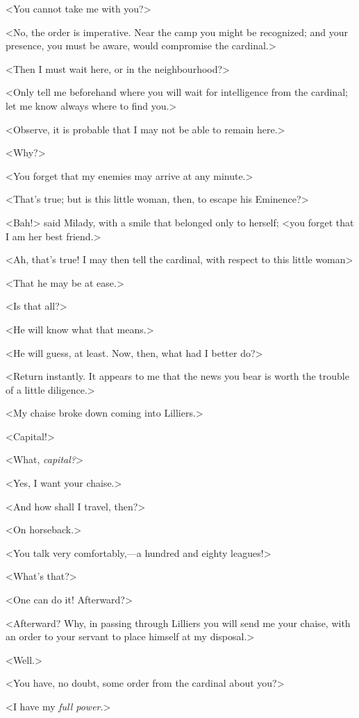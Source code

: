 <You cannot take me with you?> 

<No, the order is imperative. Near the camp you might be recognized; and your presence, you must be aware, would compromise the cardinal.> 

<Then I must wait here, or in the neighbourhood?> 

<Only tell me beforehand where you will wait for intelligence from the cardinal; let me know always where to find you.> 

<Observe, it is probable that I may not be able to remain here.> 

<Why?> 

<You forget that my enemies may arrive at any minute.> 

<That's true; but is this little woman, then, to escape his Eminence?> 

<Bah!> said Milady, with a smile that belonged only to herself; <you forget that I am her best friend.> 

<Ah, that's true! I may then tell the cardinal, with respect to this little woman\longdash> 

<That he may be at ease.> 

<Is that all?> 

<He will know what that means.> 

<He will guess, at least. Now, then, what had I better do?> 

<Return instantly. It appears to me that the news you bear is worth the trouble of a little diligence.> 

<My chaise broke down coming into Lilliers.> 

<Capital!> 

<What, \emph{capital?}> 

<Yes, I want your chaise.> 

<And how shall I travel, then?> 

<On horseback.> 

<You talk very comfortably,—a hundred and eighty leagues!> 

<What's that?> 

<One can do it! Afterward?> 

<Afterward? Why, in passing through Lilliers you will send me your chaise, with an order to your servant to place himself at my disposal.> 

<Well.> 

<You have, no doubt, some order from the cardinal about you?> 

<I have my \emph{full power}.> 

